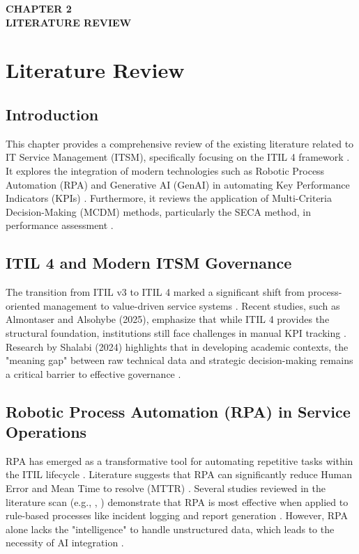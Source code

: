 \documentclass[12pt,a4paper,oneside]{report}
\begin{document}
\clearpage
\thispagestyle{empty} 
\vspace*{\fill}
\begin{center}
    {\Huge\bfseries CHAPTER 2} \\[0.5cm]
    {\Huge\bfseries LITERATURE REVIEW}
\end{center}
\vspace*{\fill}
\clearpage

\chapter{Literature Review}

\section{Introduction}
This chapter provides a comprehensive review of the existing literature related to IT Service Management (ITSM), specifically focusing on the ITIL 4 framework \cite{almontaser2025}. It explores the integration of modern technologies such as Robotic Process Automation (RPA) and Generative AI (GenAI) in automating Key Performance Indicators (KPIs) \cite{almontaser2025}. Furthermore, it reviews the application of Multi-Criteria Decision-Making (MCDM) methods, particularly the SECA method, in performance assessment \cite{almontaser2025}.

\section{ITIL 4 and Modern ITSM Governance}
The transition from ITIL v3 to ITIL 4 marked a significant shift from process-oriented management to value-driven service systems \cite{almontaser2025}. Recent studies, such as Almontaser and Alsohybe (2025), emphasize that while ITIL 4 provides the structural foundation, institutions still face challenges in manual KPI tracking \cite{almontaser2025}. Research by Shalabi (2024) highlights that in developing academic contexts, the "meaning gap" between raw technical data and strategic decision-making remains a critical barrier to effective governance \cite{shalabi2024}.

\section{Robotic Process Automation (RPA) in Service Operations}
RPA has emerged as a transformative tool for automating repetitive tasks within the ITIL lifecycle \cite{almontaser2025}. Literature suggests that RPA can significantly reduce Human Error and Mean Time to resolve (MTTR) \cite{almontaser2025}. Several studies reviewed in the literature scan (e.g., \cite{rpa_itil_2023}, \cite{rpa_business_2023}) demonstrate that RPA is most effective when applied to rule-based processes like incident logging and report generation \cite{rpa_itil_2023, rpa_business_2023}. However, RPA alone lacks the "intelligence" to handle unstructured data, which leads to the necessity of AI integration \cite{almontaser2025}.
\end{document}
